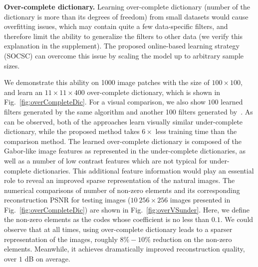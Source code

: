 {\bfseries Over-complete dictionary.}
Learning over-complete dictionary (number of the dictionary is more
than its degrees of freedom) from small datasets would cause
overfitting issues, which may contain quite a few data-specific
filters, and therefore limit the ability to generalize the filters to
other data (we verify this explanation in the supplement). The
proposed online-based learning strategy (SOCSC) can overcome this
issue by scaling the model up to arbitrary sample sizes.

We demonstrate this ability on 1000 image patches with the size of
$100 \times 100$, and learn an $11 \times 11 \times 400$ over-complete
dictionary, which is shown in Fig.~\ref{fig:overCompleteDic}. For a
visual comparison, we also show $100$ learned filters generated by the
same algorithm and another 100 filters generated
by~\cite{liu-2018-first}. As can be observed, both of the approaches
learn visually similar under-complete dictionary, while the proposed
method takes $6 \times$ less training time than the comparison
method. The learned over-complete dictionary is composed of
the Gabor-like image features as represented in the under-complete
dictionaries, as well as a number of low contrast features which are
not typical for under-complete dictionaries. This additional
feature information would play an essential role to reveal an improved sparse representation of
the natural images. The numerical comparisons of number of non-zero elements and its corresponding reconstruction PSNR for testing images ($10 ~ 256 \times 256$ images presented in Fig.~\ref{fig:overCompleteDic}) are shown in Fig.~\ref{fig:overVSunder}. Here, we define the non-zero elements as the codes whose coefficient is no less than $0.1$. We could observe that at all times, using over-complete dictionary leads to a sparser representation of the images, roughly $8\%-10\%$ reduction on the non-zero elements. Meanwhile, it achieves dramatically improved reconstruction quality, over $1$ dB on average.

